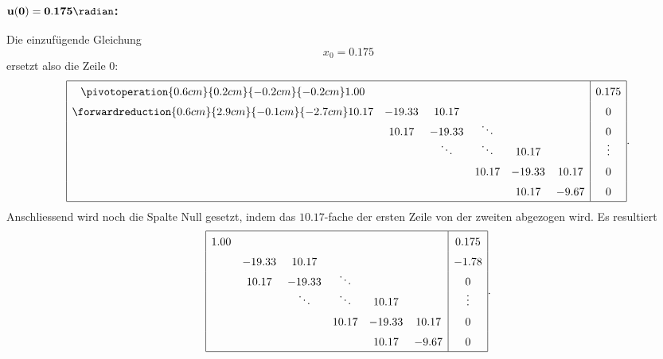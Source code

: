 \subsubsection{$\mathbf{u(0) = 0.175 \radian}$:}
Die einzufügende Gleichung
\begin{equation}
    x_0 = 0.175
\end{equation}
ersetzt also die Zeile $0$:
\begin{equation}
    \def\arraystretch{1.5}
    \begin{array}{|cccccc|c|}
        \hline
        \pivotoperation{0.6cm}{0.2cm}{-0.2cm}{-0.2cm}
         1.00  &        &                &                &        &        & 0.175          \\
        \forwardreduction{0.6cm}{2.9cm}{-0.1cm}{-2.7cm}
        10.17  &-19.33  & 10.17          &                &        &        & 0              \\
               & 10.17  &-19.33          & \smash{\ddots} &        &        & 0              \\
               &        & \smash{\ddots} & \smash{\ddots} & 10.17  &        & \smash{\vdots} \\
               &        &                & 10.17          &-19.33  & 10.17  & 0              \\
               &        &                &                & 10.17  & -9.67  & 0              \\
        \hline
    \end{array}.
\end{equation}
Anschliessend wird noch die Spalte Null gesetzt, indem das $ 10.17 $-fache der ersten Zeile von der zweiten abgezogen wird.
Es resultiert
\begin{equation}
    \def\arraystretch{1.5}
    \begin{array}{|cccccc|c|}
        \hline
         1.00  &        &                &                &        &        & 0.175          \\ 
               &-19.33  & 10.17          &                &        &        & -1.78          \\
               & 10.17  &-19.33          & \smash{\ddots} &        &        & 0              \\
               &        & \smash{\ddots} & \smash{\ddots} & 10.17  &        & \smash{\vdots} \\
               &        &                & 10.17          &-19.33  & 10.17  & 0              \\
               &        &                &                & 10.17  & -9.67  & 0              \\
        \hline
    \end{array}.
\end{equation}

